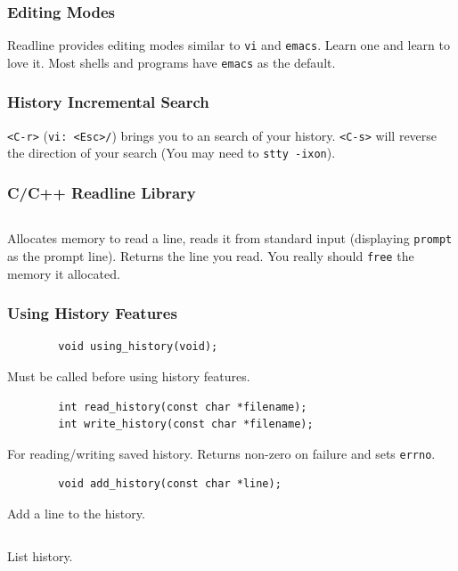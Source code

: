 \documentclass{beamer}
\begin{document}
\begin{frame}
    \frametitle{Editing Modes}
    Readline provides editing modes similar to \texttt{vi} and \texttt{emacs}.
    Learn one and learn to love it. Most shells and programs have
    \texttt{emacs} as the default.
\end{frame}

\begin{frame}
    \frametitle{History Incremental Search}
    \texttt{<C-r>} (\texttt{vi: <Esc>/}) brings you to an search of your
    history. \texttt{<C-s>} will reverse the direction of your search (You may
    need to \texttt{stty -ixon}).
\end{frame}

\begin{frame}[fragile=singleslide]
    \frametitle{C/C++ Readline Library}
    \inputminted{c}{codesnip/readlineinclude.c}

    Allocates memory to read a line, reads it from standard input (displaying
    \texttt{prompt} as the prompt line). Returns the line you read. You
    really should \texttt{free} the memory it allocated.
\end{frame}

\begin{frame}[fragile]
    \frametitle{Using History Features}
    \begin{verbatim}
        void using_history(void);
    \end{verbatim}
    Must be called before using history features.
    \pause

    \begin{verbatim}
        int read_history(const char *filename);
        int write_history(const char *filename);
    \end{verbatim}
    For reading/writing saved history. Returns non-zero on failure and sets
    \texttt{errno}.
    \pause

    \begin{verbatim}
        void add_history(const char *line);
    \end{verbatim}
    Add a line to the history.
    \pause

    \inputminted{c}{codesnip/historylist.c}
    List history.
\end{frame}
\end{document}
